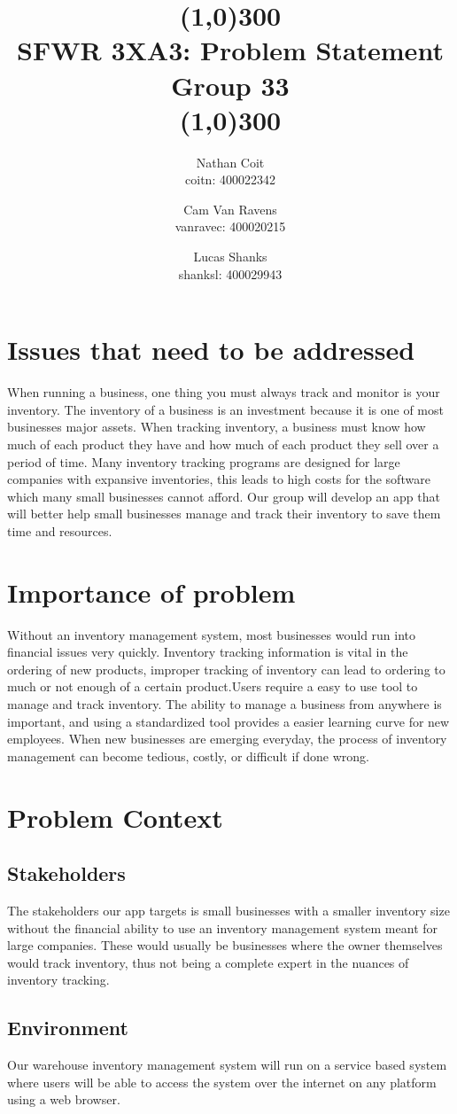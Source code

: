 \documentclass[12pt]{article}
\title{\vspace{2cm}\line(1,0){300}\\SFWR 3XA3: Problem Statement\\Group 33\\\line(1,0){300}\vspace{8cm}}
\author{Nathan Coit \\ coitn: 400022342 \and Cam Van Ravens \\ vanravec: 400020215 \and Lucas Shanks \\ shanksl: 400029943}
\begin{document}
\maketitle

\clearpage
\tableofcontents
\clearpage

\section{Issues that need to be addressed}
When running a business, one thing you must always track and monitor is your inventory. The inventory of a business is an investment because it is one of most businesses major assets. When tracking inventory, a business must know how much of each product they have and how much of each product they sell over a period of time. Many inventory tracking programs are designed for large companies with expansive inventories, this leads to high costs for the software which many small businesses cannot afford. Our group will develop an app that will better help small businesses manage and track their inventory to save them time and resources.

\section{Importance of problem}
Without an inventory management system, most businesses would run into financial issues very quickly. Inventory tracking information is vital in the ordering of new products, improper tracking of inventory can lead to ordering to much or not enough of a certain product.Users require a easy to use tool to manage and track inventory. The ability to manage a business from anywhere is important, and using a standardized tool provides a easier learning curve for new employees. When new businesses are emerging everyday, the process of inventory management can become tedious, costly, or difficult if done wrong.   

\clearpage
\section{Problem Context}
\subsection{Stakeholders}
The stakeholders our app targets is small businesses with a smaller inventory size without the financial ability to use an inventory management system meant for large companies. These would usually be businesses where the owner themselves would track inventory, thus not being a complete expert in the nuances of inventory tracking.
\subsection{Environment}
Our warehouse inventory management system will run on a service based system where users will be able to access the system over the internet on any platform using a web browser.
\end{document}
